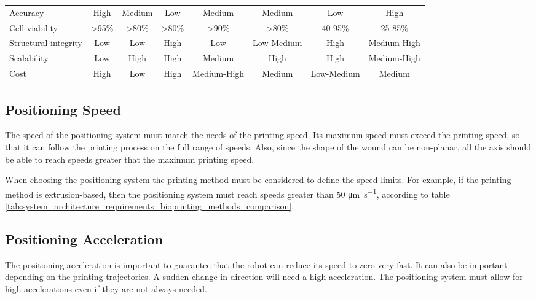 \begin{table}[ht]
\begin{adjustbox}{width=1.2\textwidth,center=\textwidth}
\begin{tabular}{lccccccc}
Accuracy & High & Medium & Low & Medium & Medium & Low & High\\

Cell viability & >95\% & >80\% & >80\% & >90\% & >80\% & 40-95\% & 25-85\%\\

Structural integrity & Low & Low & High & Low & Low-Medium & High & Medium-High\\

Scalability & Low & High & High & Medium & High & High & Medium-High\\

Cost & High & Low & High & Medium-High & Medium & Low-Medium & Medium \\
    \bottomrule
\end{tabular}
\end{adjustbox} 
\end{table}



\subsection{Positioning Speed}
\label{subsec:system_architecture_requirements_positioning_speed}

The speed of the positioning system must match the needs of the printing speed. Its maximum speed must exceed the printing speed, so that it can follow the printing process on the full range of speeds. Also, since the shape of the wound can be non-planar, all the axis should be able to reach speeds greater that the maximum printing speed.

When choosing the positioning system the printing method must be considered to define the speed limits. For example, if the printing method is extrusion-based, then the positioning system must reach speeds greater than 50 \si{\micro\meter\per\second}, according to table \ref{tab:system_architecture_requirements_bioprinting_methods_comparison}.


\subsection{Positioning Acceleration}
\label{subsec:system_architecture_requirements_positioning_acceleration}

The positioning acceleration is important to guarantee that the robot can reduce its speed to zero very fast. It can also be important depending on the printing trajectories. A sudden change in direction will need a high acceleration. The positioning system must allow for high accelerations even if they are not always needed.

